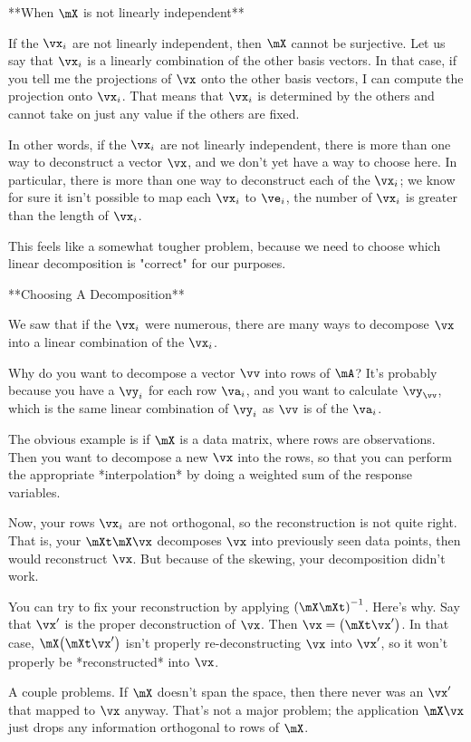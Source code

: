 **When $\mX$ is not linearly independent**

If the $\vx_i$ are not linearly independent, then $\mX$ cannot be
surjective. Let us say that $\vx_i$ is a linearly combination of the
other basis vectors. In that case, if you tell me the projections of
$\vx$ onto the other basis vectors, I can compute the projection onto
$\vx_i$. That means that $\vx_i$ is determined by the others and cannot
take on just any value if the others are fixed.

In other words, if the $\vx_i$ are not linearly independent, there is
more than one way to deconstruct a vector $\vx$, and we don't yet have a
way to choose here. In particular, there is more than one way to
deconstruct each of the $\vx_i$; we know for sure it isn't possible to
map each $\vx_i$ to $\ve_i$, the number of $\vx_i$ is greater than the
length of $\vx_i$.

This feels like a somewhat tougher problem, because we need to choose
which linear decomposition is "correct" for our purposes.

**Choosing A Decomposition**

We saw that if the $\vx_i$ were numerous, there are many ways to
decompose $\vx$ into a linear combination of the $\vx_i$.

Why do you want to decompose a vector $\vv$ into rows of $\mA$? It's
probably because you have a $\vy_i$ for each row $\va_i$, and you want
to calculate $\vy_{\vv}$, which is the same linear combination of $\vy_i$ as
$\vv$ is of the $\va_i$.

The obvious example is if $\mX$ is a data matrix, where rows are
observations. Then you want to decompose a new $\vx$ into the rows, so
that you can perform the appropriate *interpolation* by doing a
weighted sum of the response variables.

Now, your rows $\vx_i$ are not orthogonal, so the reconstruction is not
quite right. That is, your $\mXt \mX\vx$ decomposes $\vx$ into
previously seen data points, then would reconstruct $\vx$. But because
of the skewing, your decomposition didn't work.

You can try to fix your reconstruction by applying $\parensinv{\mX
\mXt}$. Here's why. Say that $\vx'$ is the proper deconstruction of
$\vx$. Then $\vx = \parens{\mXt \vx'}$. In that case, $\mX\parens{\mXt
\vx'}$ isn't properly re-deconstructing $\vx$ into $\vx'$, so it won't
properly be *reconstructed* into $\vx$.

A couple problems. If $\mX$ doesn't span the space, then there never was
an $\vx'$ that mapped to $\vx$ anyway. That's not a major problem; the
application $\mX\vx$ just drops any information orthogonal to rows of
$\mX$.

